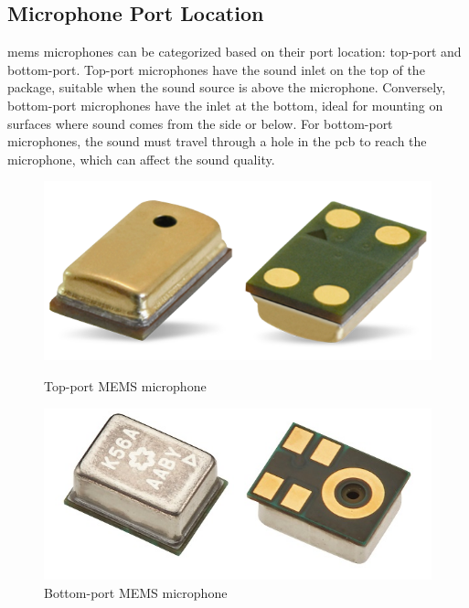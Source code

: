 \subsection{Microphone Port Location}
\acrshort{mems} microphones can be categorized based on their port location: top-port and bottom-port.
Top-port microphones have the sound inlet on the top of the package, suitable when the sound source is above the microphone.
Conversely, bottom-port microphones have the inlet at the bottom, ideal for mounting on surfaces where sound comes from the side or below.
For bottom-port microphones, the sound must travel through a hole in the \acrshort{pcb} to reach the microphone, which can affect the sound quality.
\begin{figure}[h!]
	\centering
	\begin{minipage}{0.49\textwidth}
		\centering
		\includegraphics[width=\textwidth]{images/2_preliminaries/mems_microphone_top.png}
		\caption{Top-port MEMS microphone}
		\label{fig:mems_microphone_top}
	\end{minipage}
	\begin{minipage}{0.49\textwidth}
		\centering
		\includegraphics[width=\textwidth]{images/2_preliminaries/mems_microphone_bottom.png}
		\caption{Bottom-port MEMS microphone}
		\label{fig:mems_microphone_bottom}
	\end{minipage}
\end{figure}


